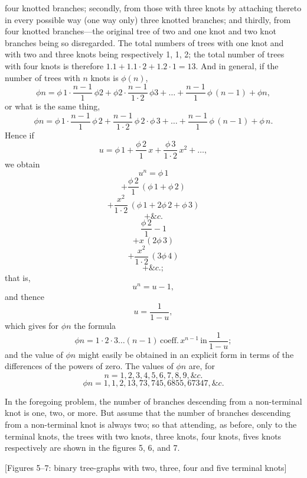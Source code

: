 \documentclass[11pt,a4paper]{article}
\begin{document}
\noindent
four knotted branches; secondly, from those with three knots by attaching thereto in every possible way (one way only) three knotted branches; and thirdly, from four knotted branches---the original tree of two and one knot and two knot branches being so disregarded. The total numbers of trees with one knot and with two and three knots being respectively 1, 1, 2; the total number of trees with four knots is therefore $1.1 + 1.1\cdot 2 + 1.2 \cdot 1 = 13$. And in general, if the number of trees with $n$ knots is $\phi(n)$,
\[
\phi n = \phi\,1\cdot\frac{n-1}{1}\,\phi 2 + \phi 2 \cdot\frac{n-1}{1\cdot 2}\,\phi 3 + \ldots + \frac{n-1}{1}\,\phi\,(n-1) + \phi n,
\]
or what is the same thing,
\[
\phi n = \phi\,1\cdot\frac{n-1}{1}\,\phi\,2 + \frac{n-1}{1\cdot 2}\,\phi\,2 \cdot \phi\,3 + \ldots + \frac{n-1}{1}\,\phi\,(n-1) + \phi\,n.
\]
Hence if
\[
u = \phi\,1 + \frac{\phi\,2}{1}\,x + \frac{\phi\,3}{1\cdot 2}\,x^2 + \ldots,
\]
we obtain
\[
u^n = \phi\,1
\]
\[
+ \frac{\phi\,2}{1}\,(\phi\,1 + \phi\,2)
\]
\[
+ \frac{x^2}{1\cdot 2}\,(\phi\,1 + 2\phi\,2 + \phi\,3)
\]
\[
+ \&c.
\]
\[
\frac{\phi\,2}{1} - 1
\]
\[
+ x\,(2\phi\,3)
\]
\[
+ \frac{x^2}{1\cdot 2}\,(3\phi\,4)
\]
\[
+ \&c.;
\]
that is,
\[
u^n = u - 1,
\]
and thence
\[
u = \frac{1}{1-u},
\]
which gives for $\phi n$ the formula
\[
\phi n = 1\cdot 2\cdot 3 \ldots (n-1)\,\text{coeff.}\,x^{n-1}\,\text{in}\,\frac{1}{1-u};
\]
and the value of $\phi n$ might easily be obtained in an explicit form in terms of the differences of the powers of zero. The values of $\phi n$ are, for
\[
n = 1, 2, 3, 4, 5, 6, 7, 8, 9, \&c.
\]
\[
\phi n = 1, 1, 2, 13, 73, 745, 6855, 67347, \&c.
\]

\setcounter{page}{114}

In the foregoing problem, the number of branches descending from a non-terminal knot is one, two, or more. But assume that the number of branches descending from a non-terminal knot is always two; so that attending, as before, only to the terminal knots, the trees with two knots, three knots, four knots, fives knots respectively are shown in the figures 5, 6, and 7.

\begin{center}
[Figures 5--7: binary tree-graphs with two, three, four and five terminal knots]
\end{center}
\end{document}
